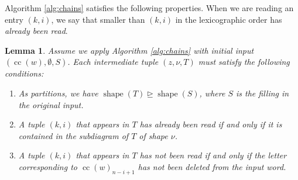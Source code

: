\documentclass[10pt]{amsart}
\theoremstyle{plain}
\theoremstyle{definition}
\theoremstyle{plain}
\newtheorem{lemma}[lemma]{Lemma}
\theoremstyle{plain}
\theoremstyle{remark}
\theoremstyle{plain}
\theoremstyle{plain}
\DeclareMathOperator{\shape}{shape}
\DeclareMathOperator{\cc}{cc}
\begin{document}
Algorithm \ref{alg:chains} satisfies the following properties.  When we are reading an entry $(k,i)$, we say that smaller than $(k,i)$ in the lexicographic order has \textit{already been read}. 
    \begin{lemma}\label{lemma: props of the alg}
    Assume we apply Algorithm \ref{alg:chains} with initial input $(\cc(w), \emptyset, S)$.
        Each intermediate tuple $(z, \nu, T)$ must  satisfy the following conditions:
    \begin{enumerate}[label=(\alph*)]
        \item As partitions, we have $\shape(T)\unrhd \shape(S)$, where $S$ is the filling in the original input.
        \item A tuple $(k,i)$ that appears in $T$ has already been read if and only if it is contained in the subdiagram of $T$ of shape $\nu$.
        \item A tuple $(k,i)$ that appears in $T$ has not been read if and only if the letter corresponding to $\cc(w)_{n-i+1}$ has not been deleted from the input word. 
    \end{enumerate}
    \end{lemma}
\end{document}
